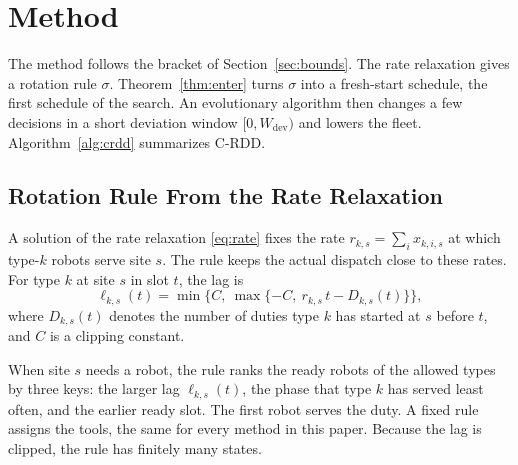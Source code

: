 \section{Method}
\label{sec:method}


The method follows the bracket of Section~\ref{sec:bounds}.
The rate relaxation gives a rotation rule $\sigma$.
Theorem~\ref{thm:enter} turns $\sigma$ into a fresh-start schedule, the first schedule of the search.
An evolutionary algorithm then changes a few decisions in a short deviation window $[0, W_{\mathrm{dev}})$ and lowers the fleet.
Algorithm~\ref{alg:crdd} summarizes C-RDD.

\subsection{Rotation Rule From the Rate Relaxation}
\label{sec:method:rule}

A solution of the rate relaxation \eqref{eq:rate} fixes the rate $r_{k,s} = \sum_i x_{k,i,s}$ at which type-$k$ robots serve site $s$.
The rule keeps the actual dispatch close to these rates.
For type $k$ at site $s$ in slot $t$, the lag is
\begin{equation}
  \ell_{k,s}(t) = \min\bigl\{C,\ \max\{-C,\ r_{k,s}\, t - D_{k,s}(t)\}\bigr\},
  \label{eq:lag}
\end{equation}
where $D_{k,s}(t)$ denotes the number of duties type $k$ has started at $s$ before $t$, and $C$ is a clipping constant.

When site $s$ needs a robot, the rule ranks the ready robots of the allowed types by three keys: the larger lag $\ell_{k,s}(t)$, the phase that type $k$ has served least often, and the earlier ready slot.
The first robot serves the duty.
A fixed rule assigns the tools, the same for every method in this paper.
Because the lag is clipped, the rule has finitely many states.

